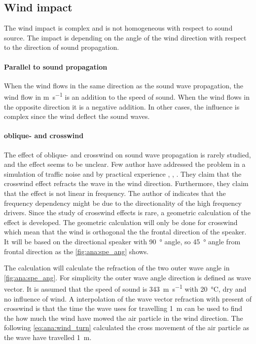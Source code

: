 

\subsection{Wind impact}
The wind impact is complex and is not homogeneous with respect to sound source. The impact is depending on the angle of the wind direction with respect to the direction of sound propagation. 


\paragraph{Parallel to sound propagation} When the wind flows in the same direction as the sound wave propagation, the wind flow in \si{\meter\per\second} is an addition to the speed of sound. When the wind flows in the opposite direction it is a negative addition.  In other cases, the influence is complex since the wind deflect the sound waves.

\paragraph{oblique- and crosswind} The effect of oblique- and crosswind on sound wave propagation is rarely studied, and the effect seems to be unclear. Few author have addressed the problem in a simulation of traffic noise and by practical experience \citep{effect_of_wind}, \citep{crosswind_effect_2016}, \citep{BALLOU2008xi}. They claim that the crosswind effect refracts the wave in the wind direction. Furthermore, they claim that the effect is not linear in frequency. The author of \citep{BALLOU2008xi} indicates that the frequency dependency might be due to the directionality of the high frequency drivers. Since the study of crosswind effects is rare, a geometric calculation of the effect is developed. The geometric calculation will only be done for crosswind which mean that the wind is orthogonal the the frontal direction of the speaker. It will be based on the directional speaker with \SI{90}{\degree} angle, so \SI{45}{\degree} angle from frontal direction as the \autoref{fig:ana:spe_ang} shows.




The calculation will calculate the refraction of the two outer wave angle in \autoref{fig:ana:spe_ang}. For simplicity the outer wave angle direction is defined as wave vector. It is assumed that the speed of sound is \SI{343}{\meter\per\second} with \SI{20}{\celsius}, dry and no influence of wind. A interpolation of the wave vector refraction with present of crosswind is that the time the wave uses for travelling \SI{1}{\meter} can be used to find the how much the wind have mowed the air particle in the wind direction. The following \autoref{eq:ana:wind_turn} calculated the cross movement of the air particle as the wave have travelled  \SI{1}{\meter}.

